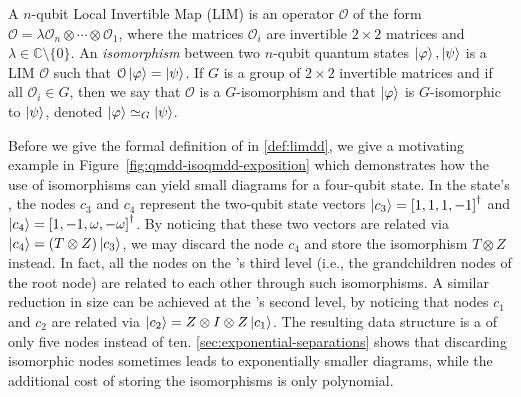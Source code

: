 \begin{definition}
	\label{def:isomorphism}
    A $n$-qubit Local Invertible Map (LIM) is an operator $\mathcal{O}$ of the form $\mathcal{O}=\lambda \mathcal{O}_n\otimes\cdots\otimes \mathcal{O}_1$, where the matrices $\mathcal{O}_i$ are invertible $2\times 2$ matrices and $\lambda\in\mathbb{C}\setminus \{0\}$.
    An \emph{isomorphism} between two $n$-qubit quantum states $\ket{\varphi},\ket{\psi}$ is a LIM $\mathcal{O}$ such that $\mathcal{O}\ket{\varphi} = \ket{\psi}$.
    If $G$ is a group of $2\times 2$ invertible matrices and if all $\mathcal{O}_i \in G$, then we say that $\mathcal{O}$ is a $G$-isomorphism and that  $\ket{\varphi}$ is $G$-isomorphic to $\ket{\psi}$, denoted $\ket{\varphi}\simeq_G\ket{\psi}$.
\end{definition}


Before we give the formal definition of \limdds in \autoref{def:limdd}, we give a motivating example in Figure~\ref{fig:qmdd-isoqmdd-exposition} which demonstrates how the use of isomorphisms can yield small diagrams for a four-qubit state.
In the state's \qmdd, the nodes $c_3$ and $c_4$ represent the two-qubit state vectors $\ket{c_3}=\left[1,1,1,-1  \right]^\dagger$ and $\ket{c_4}=\left[1,-1,\omega,-\omega  \right]^\dagger$.
By noticing that these two vectors are related via $\ket{c_4}=(T\otimes Z)\ket{c_3}$, we may discard the node $c_4$ and store the isomorphism $T\otimes Z$ instead.
In fact, all the nodes on the \qmdd's third level (i.e., the grandchildren nodes of the root node) are related to each other through such isomorphisms.
A similar reduction in size can be achieved at the \qmdd's second level, by noticing that nodes $c_1$ and $c_2$ are related via $\ket{c_2}=Z\otimes I\otimes Z\ket{c_1}$.
The resulting data structure is a \limdd of only five nodes instead of ten.
\autoref{sec:exponential-separations} shows that discarding isomorphic nodes sometimes leads to exponentially smaller diagrams, while the additional cost of storing the isomorphisms is only polynomial.

